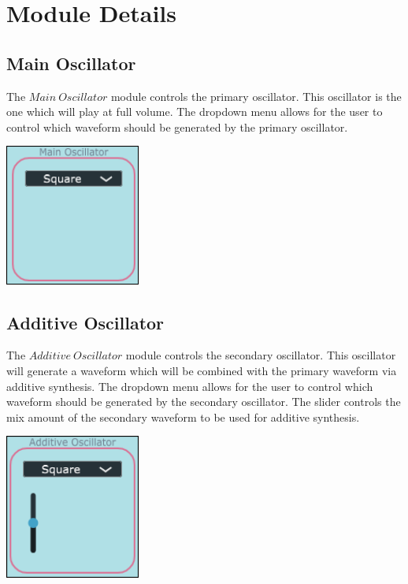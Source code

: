 \documentclass[a4paper,12pt]{report}
\begin{document}
\section{Module Details}
\label{sec:moduledetails}
\subsection{Main Oscillator}
\label{subsec:mainosc}
The $Main\ Oscillator$ module controls the primary oscillator. This oscillator is the one which will play at full volume. The dropdown menu allows for the user to control which waveform should be generated by the primary oscillator.

\begin{center}
\includegraphics[width=12em]{MainOscScreenshot.png}
\end{center}

\subsection{Additive Oscillator}
\label{subsec:addosc}
The $Additive\ Oscillator$ module controls the secondary oscillator. This oscillator will generate a waveform which will be combined with the primary waveform via additive synthesis. The dropdown menu allows for the user to control which waveform should be generated by the secondary oscillator. The slider controls the mix amount of the secondary waveform to be used for additive synthesis.

\begin{center}
\includegraphics[width=12em]{AddOscScreenshot.png}
\end{center}
\end{document}
